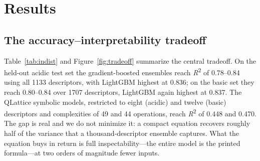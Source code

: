 \documentclass[11pt]{article}
\newcommand{\rtwo}{\textit{R}\textsuperscript{2}}
\begin{document}
\section{Results}

\subsection{The accuracy--interpretability tradeoff}

Table~\ref{tab:indist} and Figure~\ref{fig:tradeoff} summarize the central tradeoff. On the
held-out acidic test set the gradient-boosted ensembles reach \rtwo{} of 0.78--0.84 using all
1133 descriptors, with LightGBM highest at 0.836; on the basic set they reach 0.80--0.84 over
1707 descriptors, LightGBM again highest at 0.837. The QLattice symbolic models, restricted to
eight (acidic) and twelve (basic) descriptors and complexities of 49 and 44 operations, reach
\rtwo{} of 0.448 and 0.470. The gap is real and we do not minimize it: a compact equation
recovers roughly half of the variance that a thousand-descriptor ensemble captures. What the
equation buys in return is full inspectability---the entire model is the printed formula---at
two orders of magnitude fewer inputs.
\end{document}
